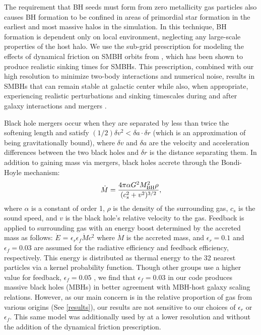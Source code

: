 \documentclass[]{emulateapj}
\begin{document}
The requirement that BH seeds must form from zero metallicity gas particles also causes BH formation to be confined in areas of primordial star formation in the earliest and most massive halos in the simulation. In this technique, BH formation is dependent only on local environment, neglecting any large-scale properties of the host halo. We use the sub-grid prescription for modeling the effects of dynamical friction on SMBH orbits from \cite{Tremmel2015}, which has been shown to produce realistic sinking times for SMBHs.  This prescription, combined with our high resolution to minimize two-body interactions and numerical noise, results in SMBHs that can remain stable at galactic center while also, when appropriate, experiencing realistic perturbations and sinking timescales during and after galaxy interactions and mergers \citep{Bellovary2011}.

Black hole mergers occur when they are separated by less than twice the softening length and satisfy $(1/2) \delta v^2 < \delta a \cdot \delta r$ (which is an approximation of being gravitationally bound),  where $\delta v$ and $\delta a$ are the velocity and acceleration differences between the two black holes and $\delta r$ is the distance separating them. In addition to gaining mass via mergers, black holes accrete through the Bondi-Hoyle mechanism:
\begin{equation}
\dot{M} = \frac{4 \pi \alpha G^2 M^{2}_{\rm BH} \rho}{(c^{2}_{s} + v^2)^{3/2}},
\end{equation}
where $\alpha$ is a constant of order 1, $\rho$ is the density of the surrounding gas, $c_s$ is the sound speed, and $v$ is the black hole's relative velocity to the gas. Feedback is applied to surrounding gas with an energy boost determined by the accreted mass as follows: $\dot{E}$ = $\epsilon _{r}$$\epsilon_{f}$$\dot{M}$$c^2$ where $\dot{M}$ is the accreted mass, and $\epsilon _r = 0.1$ and $\epsilon _f = 0.03$ are assumed for the radiative efficiency and feedback efficiency, respectively. This energy is distributed as thermal energy to the 32 nearest particles via a kernel probability function. Though other groups use a higher value for feedback, $\epsilon _f = 0.05$ \citep{Sijacki2007,DiMatteo2008}, we find that $\epsilon_f = 0.03$ in our code produces massive black holes (MBHs) in better agreement with MBH-host galaxy scaling relations. However, as our main concern is in the relative proportion of gas  from various origins (See \ref{results}), our results are not sensitive to our choices of $\epsilon _{r}$ or $\epsilon_{f}$. This same model was additionally used by \cite{Bellovary2013} at a lower resolution and without the addition of the dynamical friction prescription. 
\end{document}
